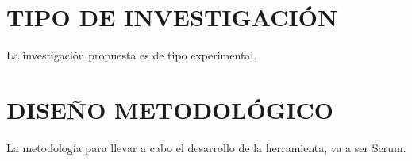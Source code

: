 \chapter{TIPO DE INVESTIGACI\'ON}
%
La investigaci\'on propuesta es de tipo experimental.%
\chapter{DISE\~NO METODOL\'OGICO}
La metodolog\'ia para llevar a cabo el desarrollo de la herramienta, va a ser Scrum.%